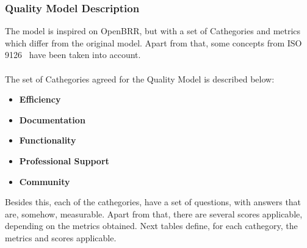 \documentclass[11pt]{article}
\begin{document}
\subsubsection{Quality Model Description}
The model is inspired on OpenBRR, but with a set of Cathegories and metrics which differ from the original model. Apart from that, some concepts from ISO 9126~\cite{ISO00, ISO01} have been taken into account.\\
\\
The set of Cathegories agreed for the Quality Model is described below:
\begin{itemize}\itemsep0pt
\item{\textbf{Efficiency}}
\item{\textbf{Documentation}}
\item{\textbf{Functionality}}
\item{\textbf{Professional Support}}
\item{\textbf{Community}}
\end{itemize}

Besides this, each of the cathegories, have a set of questions, with answers that are, somehow, measurable. Apart from that, there are several scores applicable, depending on the metrics obtained. Next tables define, for each cathegory, the metrics and scores applicable.
\end{document}
